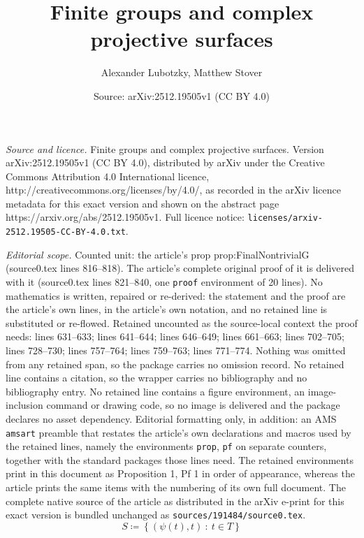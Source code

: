 \documentclass[10pt,a4paper]{amsart}
\title{Finite groups and complex projective surfaces}
\author{Alexander Lubotzky, Matthew Stover}
\date{Source: arXiv:2512.19505v1 (CC BY 4.0)}
\begin{document}
\maketitle

\noindent\emph{Source and licence.} Finite groups and complex projective surfaces. Version arXiv:2512.19505v1 (CC BY 4.0), distributed by arXiv under the Creative Commons Attribution 4.0 International licence, http://creativecommons.org/licenses/by/4.0/, as recorded in the arXiv licence metadata for this exact version and shown on the abstract page https://arxiv.org/abs/2512.19505v1. Full licence notice: \texttt{licenses/arxiv-2512.19505-CC-BY-4.0.txt}.\par\smallskip

\noindent\textit{Editorial scope.} Counted unit: the article's prop prop:FinalNontrivialG (source0.tex lines 816--818). The article's complete original proof of it is delivered with it (source0.tex lines 821--840, one \texttt{proof} environment of 20 lines). No mathematics is written, repaired or re-derived: the statement and the proof are the article's own lines, in the article's own notation, and no retained line is substituted or re-flowed.  Retained uncounted as the source-local context the proof needs: lines 631--633; lines 641--644; lines 646--649; lines 661--663; lines 702--705; lines 728--730; lines 757--764; lines 759--763; lines 771--774.  Nothing was omitted from any retained span, so the package carries no omission record.  No retained line contains a citation, so the wrapper carries no bibliography and no bibliography entry.  No retained line contains a figure environment, an image-inclusion command or drawing code, so no image is delivered and the package declares no asset dependency.  Editorial formatting only, in addition: an AMS \texttt{amsart} preamble that restates the article's own declarations and macros used by the retained lines, namely the environments \texttt{prop}, \texttt{pf} on separate counters, together with the standard packages those lines need.  The retained environments print in this document as Proposition 1, Pf 1 in order of appearance, whereas the article prints the same items with the numbering of its own full document.  The complete native source of the article as distributed in the arXiv e-print for this exact version is bundled unchanged as \texttt{sources/191484/source0.tex}.
\begin{equation}\label{eq:SDef}
S \coloneqq\!\left\{(\psi(t), t)\ :\ t \in T\right\}
\end{equation}
\end{document}
